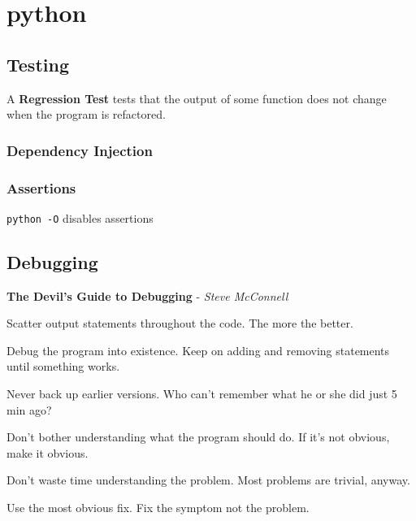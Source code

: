\documentclass[12pt]{article}
\begin{document}
\maketitle

\section{python}

\subsection{Testing}

A \textbf{Regression Test} tests that the output of some function does not change
when the program is refactored.

\scriptsize




\subsubsection{Dependency Injection}





\subsubsection{Assertions}

\texttt{python -O} disables assertions


\subsection{Debugging}

\textbf{The Devil's Guide to Debugging} - \textit{Steve McConnell}

\begin{list}{*}{
\setlength{\itemsep}{0pt}
\setlength{\parsep}{0pt}
\setlength{\topsep}{0pt}
\setlength{\partopsep}{0pt}
\setlength{\leftmargin}{2em}
\setlength{\labelwidth}{1.5em}
\setlength{\labelsep}{0.5em}
}
\item Scatter output statements throughout the code. The more the better.
\item Debug the program into existence. Keep on adding and removing statements until something works.
\item Never back up earlier versions. Who can't remember what he or she did just 5 min ago?
\item Don't bother understanding what the program should do. If it's not obvious, make it obvious.
\item Don't waste time understanding the problem. Most problems are trivial, anyway.
\item Use the most obvious fix. Fix the symptom not the problem.
\end{list}
\end{document}
